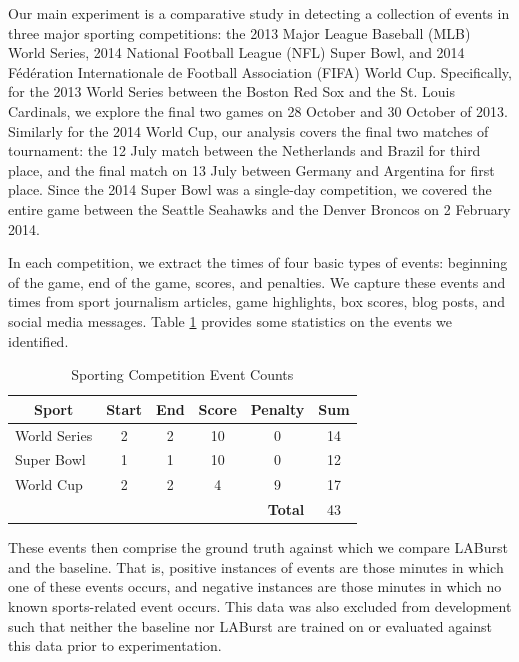 \documentclass{sig-alternate}
\newcommand{\red}[1]{\textcolor{red}{#1}}
\begin{document}
Our main experiment is a comparative study in detecting a collection of events in three major sporting competitions: the 2013 Major League Baseball (MLB) World Series, 2014 National Football League (NFL) Super Bowl, and 2014 F\'{e}d\'{e}ration Internationale de Football Association (FIFA) World Cup.
Specifically, for the 2013 World Series between the Boston Red Sox and the St. Louis Cardinals, we explore the final two games on 28 October and 30 October of 2013.
Similarly for the 2014 World Cup, our analysis covers the final two matches of tournament: the 12 July match between the Netherlands and Brazil for third place, and the final match on 13 July between Germany and Argentina for first place.
Since the 2014 Super Bowl was a single-day competition, we covered the entire game between the Seattle Seahawks and the Denver Broncos on 2 February 2014.

In each competition, we extract the times of four basic types of events: beginning of the game, end of the game, scores, and penalties.
We capture these events and times from sport journalism articles, game highlights, box scores, blog posts, and social media messages.
Table \ref{tab:eventStats} provides some statistics on the events we identified.
%
\begin{table}[htdp]
\caption{Sporting Competition Event Counts}
\begin{center}
\begin{tabular}{|p{0.7in}|c|c|c|c|c|}
\hline
\multicolumn{1}{|c|}{\textbf{Sport}} & \textbf{Start} & \textbf{End} & \textbf{Score} & \textbf{Penalty} & \textbf{Sum} \\ \hline
World Series & 2 & 2 & 10 & 0 & 14 \\ \hline
Super Bowl & 1 & 1 & 10 & 0 & 12 \\ \hline
World Cup & 2 & 2 & 4 & 9 & 17 \\ \hline
\multicolumn{5}{|r|}{\textbf{Total}} & 43 \\ \hline
\end{tabular}
\end{center}
\label{tab:eventStats}
\end{table}


These events then comprise the ground truth against which we compare LABurst and the baseline.
That is, positive instances of events are those minutes in which one of these events occurs, and negative instances are those minutes in which no known sports-related event occurs.
This data was also excluded from development such that neither the baseline nor LABurst are trained on or evaluated against this data prior to experimentation.
\end{document}
